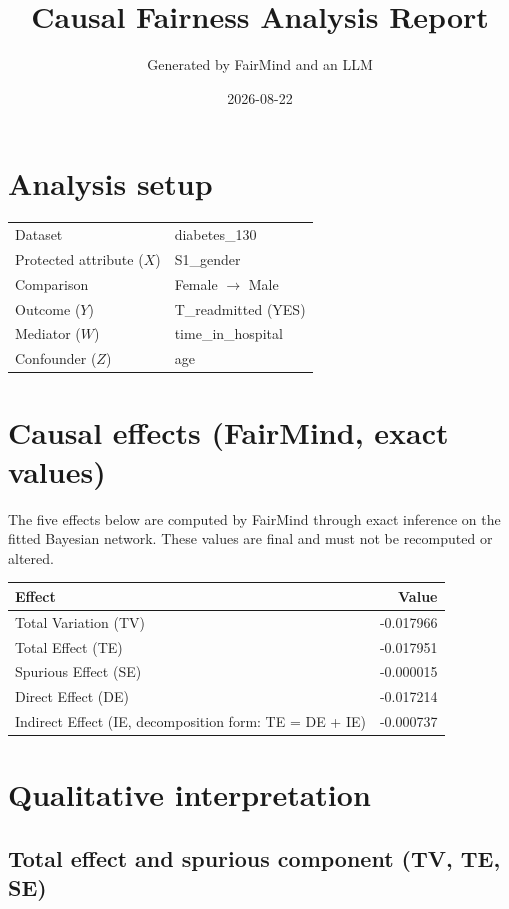 \documentclass[11pt]{article}
\title{Causal Fairness Analysis Report}
\author{Generated by FairMind and an LLM}
\date{2026-08-22}
\begin{document}
\maketitle

\section{Analysis setup}

\begin{tabular}{ll}
\toprule
Dataset & diabetes\_130 \\
Protected attribute ($X$) & S1\_gender \\
Comparison & Female $\to$ Male \\
Outcome ($Y$) & T\_readmitted (YES) \\
Mediator ($W$) & time\_in\_hospital \\
Confounder ($Z$) & age \\
\bottomrule
\end{tabular}

\section{Causal effects (FairMind, exact values)}

The five effects below are computed by FairMind through exact inference on the
fitted Bayesian network. These values are final and must not be recomputed or
altered.

\begin{tabular}{lr}
\toprule
Effect & Value \\
\midrule
Total Variation (TV) & -0.017966 \\
Total Effect (TE) & -0.017951 \\
Spurious Effect (SE) & -0.000015 \\
Direct Effect (DE) & -0.017214 \\
Indirect Effect (IE, decomposition form: TE = DE + IE) & -0.000737 \\
\bottomrule
\end{tabular}

\section{Qualitative interpretation}

\subsection{Total effect and spurious component (TV, TE, SE)}
\end{document}
